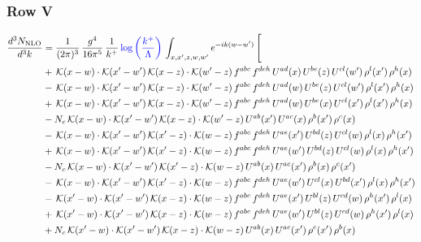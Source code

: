 \documentclass[9pt]{article}
\numberwithin{equation}{section}
\begin{document}
\subsubsection{Row V}
\begin{align}
\frac{d^{3}N_{\mathrm{NLO}}}{d^{3}k} & = \frac{1}{(2\pi)^{3}}\,\frac{g^{4}}{16\pi^{5}}\,\frac{1}{k^{+}}\,{\color{blue}\log{\left(\frac{k^{+}}{\Lambda}\right)}}\,\int_{x,x',z,w,w'}e^{-ik(w-w')}\,\Bigg[\notag\\ &  +\,\mathcal{K}(x-w)\cdot\mathcal{K}(x'-w')\,\mathcal{K}(x-z)\cdot\mathcal{K}(w'-z)\,f^{abc}\,f^{deh}\,U^{ad}(x)\,U^{be}(z)\,U^{cl}(w')\,\rho^{l}(x')\,\rho^{h}(x)\notag\\
& -\,\mathcal{K}(x-w)\cdot\mathcal{K}(x'-w')\,\mathcal{K}(x-z)\cdot\mathcal{K}(w'-z)\,f^{abc}\,f^{deh}\,U^{ad}(w)\,U^{be}(z)\,U^{cl}(w')\,\rho^{l}(x')\,\rho^{h}(x)\notag\\
& +\,\mathcal{K}(x-w)\cdot\mathcal{K}(x'-w')\,\mathcal{K}(x-z)\cdot\mathcal{K}(w'-z)\,f^{abc}\,f^{deh}\,U^{ad}(w)\,U^{be}(x)\,U^{cl}(x')\,\rho^{l}(x')\,\rho^{h}(x)\notag\\
& -N_{c}\,\mathcal{K}(x-w)\cdot\mathcal{K}(x'-w')\,\mathcal{K}(x-z)\cdot\mathcal{K}(w'-z)\,U^{ab}(x')\,U^{ac}(x)\,\rho^{b}(x')\,\rho^{c}(x)\notag\\
& -\,\mathcal{K}(x-w)\cdot\mathcal{K}(x'-w')\,\mathcal{K}(x'-z)\cdot\mathcal{K}(w-z)\,f^{abc}\,f^{deh}\,U^{ae}(x')\,U^{bd}(z)\,U^{cl}(w)\,\rho^{l}(x)\,\rho^{h}(x')\notag\\
& +\,\mathcal{K}(x-w)\cdot\mathcal{K}(x'-w')\,\mathcal{K}(x'-z)\cdot\mathcal{K}(w-z)\,f^{abc}\,f^{deh}\,U^{ae}(w')\,U^{bd}(z)\,U^{cl}(w)\,\rho^{l}(x)\,\rho^{h}(x')\notag\\
& -N_{c}\,\mathcal{K}(x-w)\cdot\mathcal{K}(x'-w')\,\mathcal{K}(x'-z)\cdot\mathcal{K}(w-z)\,U^{ab}(x)\,U^{ac}(x')\,\rho^{b}(x)\,\rho^{c}(x')\notag\\
& -\,\mathcal{K}(x-w)\cdot\mathcal{K}(x'-w')\,\mathcal{K}(x'-z)\cdot\mathcal{K}(w-z)\,f^{abc}\,f^{deh}\,U^{ae}(w')\,U^{cl}(x)\,U^{bd}(x')\,\rho^{l}(x)\,\rho^{h}(x')\notag\\
& -\,\mathcal{K}(x'-w)\cdot\mathcal{K}(x'-w')\,\mathcal{K}(x-z)\cdot\mathcal{K}(w-z)\,f^{abc}\,f^{deh}\,U^{ae}(x')\,U^{bl}(z)\,U^{cd}(w)\,\rho^{h}(x')\,\rho^{l}(x)\notag\\
& +\,\mathcal{K}(x'-w)\cdot\mathcal{K}(x'-w')\,\mathcal{K}(x-z)\cdot\mathcal{K}(w-z)\,f^{abc}\,f^{deh}\,U^{ae}(w')\,U^{bl}(z)\,U^{cd}(w)\,\rho^{h}(x')\,\rho^{l}(x)\notag\\
& +N_{c}\,\mathcal{K}(x'-w)\cdot\mathcal{K}(x'-w')\,\mathcal{K}(x-z)\cdot\mathcal{K}(w-z)\,U^{ab}(x)\,U^{ac}(x')\,\rho^{c}(x')\,\rho^{b}(x)\notag\\

\end{align}
\end{document}
